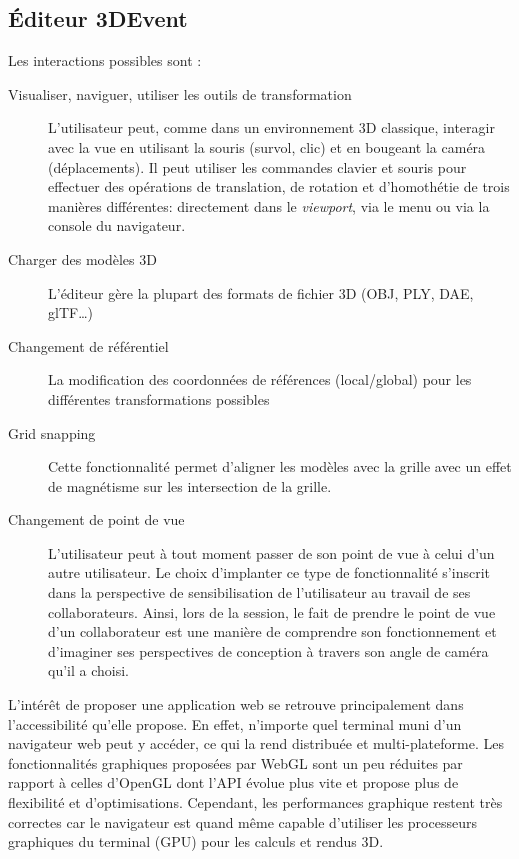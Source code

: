 \subsection{Éditeur 3DEvent}


Les interactions possibles sont : 
\begin{description}
	
	\item[Visualiser, naviguer, utiliser les outils de transformation] L'utilisateur peut, 
	com\-me dans un environnement \gls{3D} classique, interagir avec la vue en 
	utilisant 
	la souris (survol, clic) et en bougeant la caméra (déplacements). Il peut 
	utiliser les commandes clavier et souris pour effectuer des opérations de 
	translation, de rotation et d'homothétie de trois manières différentes: directement dans le \textit{viewport}, via le 
	menu ou via la console du navigateur.
	\item[Charger des modèles \gls{3D}] L'éditeur gère la plupart des formats de 
	fichier 
	3D (OBJ, PLY, DAE, glTF\ldots)
	\item[Changement de référentiel] La modification des coordonnées de 
	réfé\-ren\-ces (local/global)  pour les différentes transformations possibles
	\item[Grid snapping] Cette fonctionnalité permet d'aligner les modèles avec la 
	grille avec un effet de magnétisme sur les intersection de la grille.
	\item[Changement de point de vue] L'utilisateur peut à tout moment passer de 
	son point de vue à celui d'un autre utilisateur. Le choix d'implanter ce type de 
	fonctionnalité s'inscrit dans la perspective de sensibilisation de l'utilisateur au 
	travail de ses collaborateurs. Ainsi, lors de la session, le fait de prendre le 
	point de vue d'un collaborateur est une manière de 
	comprendre son fonctionnement et d'imaginer ses 
	perspectives de conception à travers son angle de caméra qu'il a choisi.
\end{description}

L'intérêt de proposer une application web se retrouve principalement dans 
l'accessibilité qu'elle propose. En effet, n'importe quel terminal muni d'un 
navigateur web peut y accéder, ce qui la rend distribuée et multi-plateforme. 
Les fonctionnalités graphiques proposées par WebGL sont un peu réduites par 
rapport à celles d'OpenGL dont l'\gls{API} évolue plus vite et propose plus de 
flexibilité et d'optimisations. Cependant, les performances graphique restent très 
correctes car le navigateur est quand même capable d'utiliser les processeurs 
graphiques du terminal (GPU) pour les calculs et rendus \gls{3D}.

